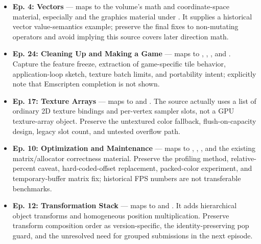 \begin{itemize}
\item
  \textbf{Ep. 4: Vectors} --- maps to the volume's math and coordinate-space material, especially  and the graphics material under . It supplies a historical vector value-semantics example; preserve the final fixes to non-mutating operators and avoid implying this source covers later direction math.
\item
  \textbf{Ep. 24: Cleaning Up and Making a Game} --- maps to , , , and . Capture the feature freeze, extraction of game-specific tile behavior, application-loop sketch, texture batch limits, and portability intent; explicitly note that Emscripten completion is not shown.
\item
  \textbf{Ep. 17: Texture Arrays} --- maps to  and . The source actually uses a list of ordinary 2D texture bindings and per-vertex sampler slots, not a GPU texture-array object. Preserve the untextured color fallback, flush-on-capacity design, legacy slot count, and untested overflow path.
\item
  \textbf{Ep. 10: Optimization and Maintenance} --- maps to , , , and the existing matrix/allocator correctness material. Preserve the profiling method, relative-percent caveat, hard-coded-offset replacement, packed-color experiment, and temporary-buffer matrix fix; historical FPS numbers are not transferable benchmarks.
\item
  \textbf{Ep. 12: Transformation Stack} --- maps to  and . It adds hierarchical object transforms and homogeneous position multiplication. Preserve transform composition order as version-specific, the identity-preserving pop guard, and the unresolved need for grouped submissions in the next episode.

\end{itemize}
